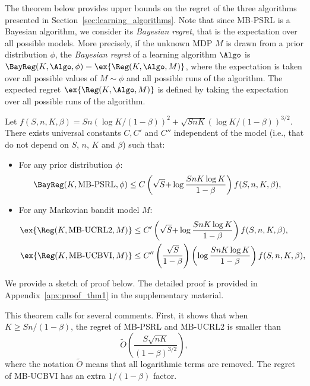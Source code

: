 The theorem below provides upper bounds on the regret of the three algorithms presented in Section~\ref{sec:learning_algorithms}. Note that since MB-PSRL is a Bayesian algorithm, we consider its \emph{Bayesian regret}, that is the expectation over all possible models. More precisely, if the unknown MDP $M$ is drawn from a prior distribution $\phi$, the \textit{Bayesian regret} of a learning algorithm $\Algo$ is $\BayReg(K,\Algo,\phi) = \ex{\Reg(K,\Algo,M)}$, where the expectation is taken over all possible values of $M \sim \phi$ and all possible runs of the algorithm. The expected regret $\ex{\Reg(K,\Algo,M)}$ is defined by taking the expectation over all possible runs of the algorithm.

\begin{thm}
    \label{thm:regret_upper_bound}
    Let $f(S,n,K,\beta)=Sn\left(\log K/(1{-}\beta)\right)^{2}+ \sqrt{SnK}\left(\log K/(1{-}\beta)\right)^{3/2}$. There exists universal constants $C, C'$ and $C''$ independent of the model (i.e., that do not depend on $S$, $n$, $K$ and $\beta$) such that:
    \begin{itemize}
        \item For any prior distribution $\phi$:
        \begin{align*}
            \BayReg(K,\text{MB-PSRL},\phi) &\le C\left(\sqrt{S} {+}\log\frac{SnK\log K}{1-\beta}\right) f(S,n,K,\beta),
        \end{align*}
        \item For any Markovian bandit model $M$:
    \begin{align*}
        \ex{\Reg(K,\text{MB-UCRL2},M)} &\le C'\left(\sqrt{S} {+}\log\frac{SnK\log K}{1-\beta}\right) f(S,n,K,\beta),\\
        \ex{\Reg(K,\text{MB-UCBVI},M)} &\le C''\left(\frac{\sqrt{S}}{1-\beta}\right)\left(\log\frac{SnK\log K}{1-\beta}\right) f(S,n,K,\beta),
    \end{align*}
    \end{itemize}
\end{thm}

We provide a sketch of proof below. The detailed proof is provided in Appendix~\ref{apx:proof_thm1} in the supplementary material.

This theorem calls for several comments. First, it shows that when $K\ge Sn/(1-\beta)$, the regret of MB-PSRL and MB-UCRL2 is smaller than 
\begin{equation}
    \label{eq:regret_tilde}
    \tilde{O}\left(\frac{S\sqrt{nK}}{(1-\beta)^{3/2}}\right),
\end{equation}
where the notation $\tilde{O}$ means that all logarithmic terms are removed. The regret of MB-UCBVI has an extra $1/(1-\beta)$ factor. 

